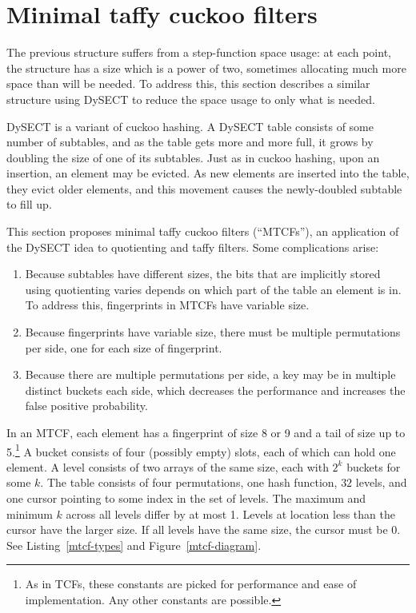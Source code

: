 \documentclass[sigconf, nonacm]{acmart}
\begin{document}


\section{Minimal taffy cuckoo filters}
\label{mtcf}

The previous structure suffers from a step-function space usage:
at each point, the structure has a size which is a power of two, sometimes allocating much more space than will be needed.
To address this, this section describes a similar structure using DySECT to reduce the space usage to only what is needed.~\cite{dysect}

DySECT is a variant of cuckoo hashing.
A DySECT table consists of some number of subtables, and as the table gets more and more full, it grows by doubling the size of one of its subtables.
Just as in cuckoo hashing, upon an insertion, an element may be evicted.
As new elements are inserted into the table, they evict older elements, and this movement causes the newly-doubled subtable to fill up.

This section proposes minimal taffy cuckoo filters (``MTCFs''), an application of the DySECT idea to quotienting and taffy filters.
Some complications arise:

\begin{enumerate}
  \item Because subtables have different sizes, the bits that are implicitly stored using quotienting varies depends on which part of the table an element is in.
    To address this, fingerprints in MTCFs have variable size.
  \item Because fingerprints have variable size, there must be multiple permutations per side, one for each size of fingerprint.
  \item Because there are multiple permutations per side, a key may be in multiple distinct buckets each side, which decreases the performance and increases the false positive probability.
\end{enumerate}

In an MTCF, each element has a fingerprint of size 8 or 9 and a tail of size up to 5.\footnote{As in TCFs, these constants are picked for performance and ease of implementation.
Any other constants are possible.
}
A bucket consists of four (possibly empty) slots, each of which can hold one element.
A level consists of two arrays of the same size, each with $2^k$ buckets for some $k$.
The table consists of four permutations, one hash function, $32$ levels, and one cursor pointing to some index in the set of levels.
The maximum and minimum $k$ across all levels differ by at most 1.
Levels at location less than the cursor have the larger size.
If all levels have the same size, the cursor must be 0.
See Listing~\ref{mtcf-types} and Figure~\ref{mtcf-diagram}.
\end{document}
